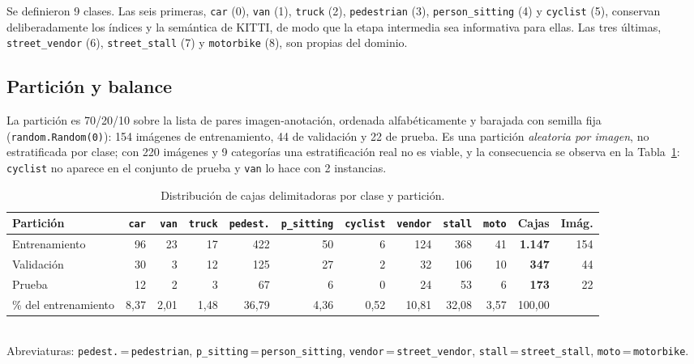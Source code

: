 \documentclass[10pt,a4paper]{article}
\begin{document}
Se definieron 9 clases. Las seis primeras, \texttt{car} (0), \texttt{van} (1),
\texttt{truck} (2), \texttt{pedestrian} (3), \texttt{person\_sitting} (4) y
\texttt{cyclist} (5), conservan deliberadamente los índices y la semántica de KITTI, de
modo que la etapa intermedia sea informativa para ellas. Las tres últimas,
\texttt{street\_vendor} (6), \texttt{street\_stall} (7) y \texttt{motorbike} (8), son
propias del dominio.

\subsection{Partición y balance}
La partición es 70/20/10 sobre la lista de pares imagen-anotación, ordenada
alfabéticamente y barajada con semilla fija (\texttt{random.Random(0)}): 154 imágenes de
entrenamiento, 44 de validación y 22 de prueba. Es una partición \emph{aleatoria por
imagen}, no estratificada por clase; con 220 imágenes y 9 categorías una estratificación
real no es viable, y la consecuencia se observa en la Tabla~\ref{tab:balance}:
\texttt{cyclist} no aparece en el conjunto de prueba y \texttt{van} lo hace con 2
instancias.

\begin{table}[H]
\centering\footnotesize
\caption{Distribución de cajas delimitadoras por clase y partición.}
\label{tab:balance}
\begin{tabular}{@{}lrrrrrrrrrrr@{}}
\toprule
\textbf{Partición} & \texttt{car} & \texttt{van} & \texttt{truck} & \texttt{pedest.} &
\texttt{p\_sitting} & \texttt{cyclist} & \texttt{vendor} & \texttt{stall} & \texttt{moto} &
\textbf{Cajas} & \textbf{Imág.}\\
\midrule
Entrenamiento & 96 & 23 & 17 & 422 & 50 & 6 & 124 & 368 & 41 & \textbf{1.147} & 154\\
Validación    & 30 &  3 & 12 & 125 & 27 & 2 &  32 & 106 & 10 & \textbf{347}   &  44\\
Prueba        & 12 &  2 &  3 &  67 &  6 & 0 &  24 &  53 &  6 & \textbf{173}   &  22\\
\midrule
\% del entrenamiento & 8{,}37 & 2{,}01 & 1{,}48 & 36{,}79 & 4{,}36 & 0{,}52 & 10{,}81 &
32{,}08 & 3{,}57 & 100{,}00 & \\
\bottomrule
\end{tabular}\\[2pt]
{\scriptsize Abreviaturas: \texttt{pedest.}\,=\,\texttt{pedestrian},
\texttt{p\_sitting}\,=\,\texttt{person\_sitting}, \texttt{vendor}\,=\,\texttt{street\_vendor},
\texttt{stall}\,=\,\texttt{street\_stall}, \texttt{moto}\,=\,\texttt{motorbike}.}
\end{table}
\end{document}
